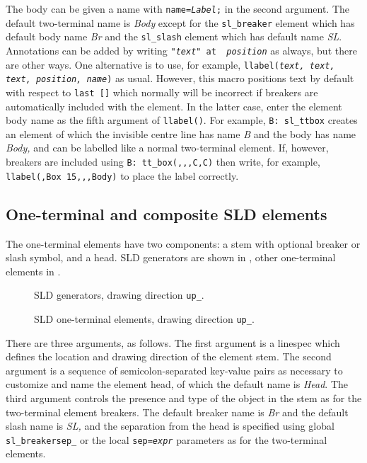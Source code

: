 The body can be given a name with {\tt name={\sl Label};} in the
second argument. The default two-terminal name is {\sl Body}
except for the {\tt sl\_breaker} element which has default body name {\sl Br}
and the {\tt sl\_slash} element which has default name {\sl SL}.
Annotations can be added by writing {\tt "{\sl text}" at {\sl
position}} as always, but there are other ways.  One alternative is to
use, for example, {\tt llabel({\sl text, text, text, position, name})}
as usual.  However, this macro positions text by default with respect
to {\tt last []} which normally will be incorrect if breakers are
automatically included with the element.
In the latter case, enter the element body name as the fifth argument
of {\tt llabel()}.
For example, {\tt B: sl\_ttbox} creates an element of which
the invisible centre line has name {\sl B} and the body has name {\sl Body,}
and can be labelled like a normal two-terminal element.  If, however,
breakers are included using {\tt B: tt\_box(,{,},C,C)} then write, for example,
{\tt llabel(,Box 15,{,},Body)} to place the label correctly.

\subsection{One-terminal and composite SLD elements\label{OneTermSLD:}}
The one-terminal elements have two components: a stem with optional
breaker or slash symbol, and a head.
SLD generators are shown in , other
one-terminal elements in .
\begin{figure}[H]
   \SLDGenerators
   \caption{SLD generators, drawing direction {\tt up\_}.}
   \label{SLDGenerators}
   \end{figure}
\begin{figure}[H]
   \SLDOneTerms
   \caption{SLD one-terminal elements, drawing direction {\tt up\_}.}
   \label{SLDOneTerms}
   \end{figure}
There are three arguments, as follows.
The first argument is a linespec which defines the location and drawing
direction of the element stem.
The second argument is a sequence of semicolon-separated key-value pairs
as necessary to customize and name the element head, of which the
default name is {\sl Head}.
The third argument controls the presence and type of the object in the stem
as for the two-terminal element breakers.  The default breaker name is {\sl Br}
and the default slash name is {\sl SL,} and the separation from the head
is specified using global {\tt sl\_breakersep\_} or the local
{\tt sep={\sl expr}} parameters as for the two-terminal elements.

